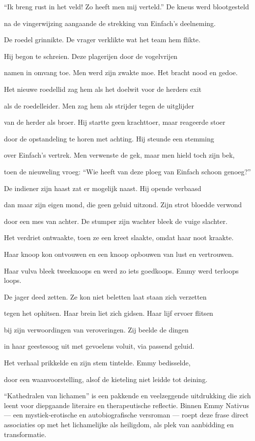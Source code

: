 “Ik breng rust in het veld!
Zo heeft men mij verteld.”
De kneus werd blootgesteld

na de vingerwijzing
aangaande de strekking
van Einfach’s deelneming.

De roedel grinnikte.
De vrager verklikte
wat het team hem flikte.

Hij begon te schreien.
Deze plagerijen
door de vogelvrijen

namen in omvang toe.
Men werd zijn zwakte moe.
Het bracht nood en gedoe.

Het nieuwe roedellid
zag hem als het doelwit
voor de herders exit

als de roedelleider.
Men zag hem als strijder
tegen de uitglijder

van de herder als broer.
Hij startte geen krachttoer,
maar reageerde stoer

door de opstandeling
te horen met achting.
Hij steunde een stemming

over Einfach’s vertrek.
Men verwenste de gek,
maar men hield toch zijn bek,

toen de nieuweling vroeg:
“Wie heeft van deze ploeg
van Einfach schoon genoeg?”

De indiener zijn haast
zat er mogelijk naast.
Hij opende verbaasd

dan maar zijn eigen mond,
die geen geluid uitzond.
Zijn strot bloedde verwond

door een mes van achter.
De stumper zijn wachter
bleek de vuige slachter.

Het verdriet ontwaakte,
toen ze een kreet slaakte,
omdat haar noot kraakte.

Haar knoop kon ontvouwen
en een knoop opbouwen
van lust en vertrouwen.

Haar vulva bleek tweeknoops
en werd zo iets goedkoops.
Emmy werd terloops loops.

De jager deed zetten.
Ze kon niet beletten
laat staan zich verzetten

tegen het ophitsen.
Haar brein liet zich gidsen.
Haar lijf ervoer flitsen

bij zijn verwoordingen
van veroveringen.
Zij beelde de dingen

in haar geestesoog uit
met gevoelens voluit,
via passend geluid.

Het verhaal prikkelde
en zijn stem tintelde.
Emmy bedisselde,

door een waanvoorstelling,
alsof de kieteling
niet leidde tot deining.

“Kathedralen van lichamen” is een pakkende en veelzeggende uitdrukking die zich leent voor diepgaande literaire en therapeutische reflectie. Binnen Emmy Nativus — een mystiek-erotische en autobiografische versroman — roept deze frase direct associaties op met het lichamelijke als heiligdom, als plek van aanbidding en transformatie.

